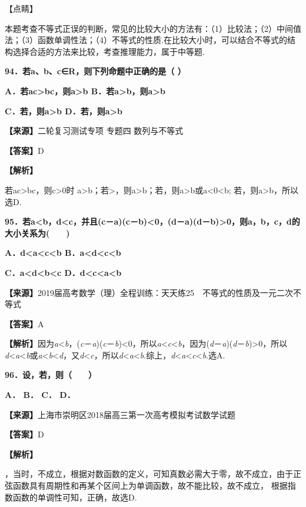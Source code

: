 【点睛】

本题考查不等式正误的判断，常见的比较大小的方法有：（1）比较法；（2）中间值法；（3）函数单调性法；（4）不等式的性质.在比较大小时，可以结合不等式的结构选择合适的方法来比较，考查推理能力，属于中等题.

\textbf{94．若a、b、c∈R，则下列命题中正确的是（ ）}

\textbf{A．若ac\textgreater bc，则a\textgreater b
B．若a\textgreater b，则a\textgreater b}

\textbf{C．若，则a\textgreater b D．若，则a\textgreater b}

\textbf{【来源】}二轮复习测试专项 专题四 数列与不等式

\textbf{【答案】}D

\textbf{【解析】}

若ac\textgreater bc，则c\textgreater0时
a\textgreater b；若\textgreater，则\textbar a\textbar\textgreater\textbar b\textbar；若，则a\textgreater b或a\textless0\textless b;
若，则a\textgreater b，所以选D.

\textbf{95．若a\textless b，d\textless c，并且(c－a)(c－b)\textless0，(d－a)(d－b)\textgreater0，则a，b，c，d的大小关系为(　　)}

\textbf{A．d\textless a\textless c\textless b
B．a\textless d\textless c\textless b}

\textbf{C．a\textless d\textless b\textless c
D．d\textless c\textless a\textless b}

\textbf{【来源】}2019届高考数学（理）全程训练：天天练25　不等式的性质及一元二次不等式

\textbf{【答案】}A

\textbf{【解析】}因为\emph{a}\textless{}\emph{b}，(\emph{c}－\emph{a})(\emph{c}－\emph{b})\textless0，所以\emph{a}\textless{}\emph{c}\textless{}\emph{b}，因为(\emph{d}－\emph{a})(\emph{d}－\emph{b})\textgreater0，所以\emph{d}\textless{}\emph{a}\textless{}\emph{b}或\emph{a}\textless{}\emph{b}\textless{}\emph{d}，又\emph{d}\textless{}\emph{c}，所以\emph{d}\textless{}\emph{a}\textless{}\emph{b}.综上，\emph{d}\textless{}\emph{a}\textless{}\emph{c}\textless{}\emph{b}.选A.

\textbf{96．设，若，则（　　）}

\textbf{A． B． C． D．}

\textbf{【来源】}上海市崇明区2018届高三第一次高考模拟考试数学试题

\textbf{【答案】}D

\textbf{【解析】}

，当时，不成立，根据对数函数的定义，可知真数必需大于零，故不成立，由于正弦函数具有周期性和再某个区间上为单调函数，故不能比较，故不成立，
根据指数函数的单调性可知，正确，故选D.


